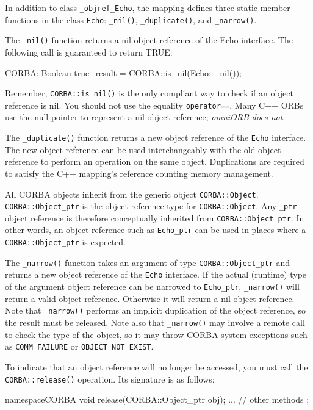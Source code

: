 \documentclass[11pt,twoside,a4paper]{book}
\newcommand{\type}[1]{\texttt{#1}}
\newcommand{\intf}[1]{\texttt{#1}}
\newcommand{\code}[1]{\texttt{#1}}
\newcommand{\op}[1]{\texttt{#1()}}
\newcommand{\dsc}{\discretionary{}{}{}}
\begin{document}
In addition to class \type{\_objref\_Echo}, the mapping defines three
static member functions in the class \type{Echo}: \op{\_nil},
\op{\_duplicate}, and \op{\_narrow}.

The \op{\_nil} function returns a nil object reference of the Echo
interface. The following call is guaranteed to return TRUE:

\begin{cxxlisting}
CORBA::Boolean true_result = CORBA::is_nil(Echo::_nil());
\end{cxxlisting}

Remember, \op{CORBA::is\_nil} is the only compliant way to check if an
object reference is nil. You should not use the equality
\code{operator==}. Many C++ ORBs use the null pointer to represent a
nil object reference; \emph{omniORB does not}.

The \op{\_duplicate} function returns a new object reference of the
\intf{Echo} interface. The new object reference can be used
interchangeably with the old object reference to perform an operation
on the same object. Duplications are required to satisfy the C++
mapping's reference counting memory management.

All CORBA objects inherit from the generic object
\type{CORBA::Object}.  \type{CORBA::\dsc{}Object\_ptr} is the object
reference type for \type{CORBA::Object}.  Any \type{\_ptr} object
reference is therefore conceptually inherited from
\type{CORBA::Object\_ptr}. In other words, an object reference such as
\type{Echo\_ptr} can be used in places where a
\type{CORBA::Object\_ptr} is expected.

The \op{\_narrow} function takes an argument of type
\type{CORBA::Object\_ptr} and returns a new object reference of the
\intf{Echo} interface.  If the actual (runtime) type of the argument
object reference can be narrowed to \type{Echo\_ptr}, \op{\_narrow}
will return a valid object reference. Otherwise it will return a nil
object reference. Note that \op{\_narrow} performs an implicit
duplication of the object reference, so the result must be released.
Note also that \op{\_narrow} may involve a remote call to check the
type of the object, so it may throw CORBA system exceptions such as
\code{COMM\_FAILURE} or \code{OBJECT\_NOT\_EXIST}.

To indicate that an object reference will no longer be accessed, you
must call the \op{CORBA::release} operation. Its signature is as
follows:

\begin{cxxlisting}
namespaceCORBA {
  void release(CORBA::Object_ptr obj);
  ... // other methods
};
\end{cxxlisting}
\end{document}
